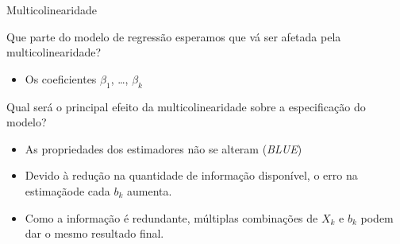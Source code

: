 \documentclass{beamer}\usepackage[]{graphicx}\usepackage[]{color}
\begin{document}
\begin{frame}{Multicolinearidade}

Que parte do modelo de regressão esperamos que vá ser afetada pela multicolinearidade?  \pause

\begin{itemize}

\item Os coeficientes $\beta _1$, \ldots, $\beta _k$ \pause

\end{itemize}

Qual será o principal efeito da multicolinearidade sobre a especificação do modelo? \pause

\begin{itemize}

\item As propriedades dos estimadores não se alteram (\emph{BLUE}) \pause

\item Devido à redução na quantidade de informação disponível, o erro na estimaçãode cada $b_k$ aumenta. \pause

\item Como a informação é redundante, múltiplas combinações de $X_k$ e $b_k$ podem dar o mesmo resultado final. 
 
\end{itemize}

\end{frame}
\end{document}
